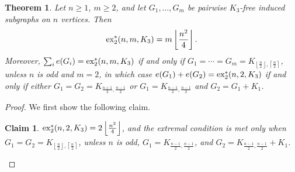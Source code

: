 \documentclass[12pt]{report}
\newtheorem{theorem}{Theorem}[chapter]
\newtheorem{claim}{Claim}[theorem]
\newcommand*{\dex}{\textnormal{ex}_2}
\begin{document}
\begin{theorem}\label{thm:induce-triangle}
  Let $n \geq 1$, $m \geq 2$, and let $G_1, \ldots, G_m$ be pairwise $K_3$-free induced subgraphs on $n$ vertices. Then
  \[
    \dex^*(n, m, K_3) = m \left\lfloor \frac{n^2}{4} \right\rfloor.
  \]
  Moreover, $\sum_i e(G_i) = \dex^*(n, m, K_3)$ if and only if $G_1 = \cdots = G_m = K_{\left\lfloor\frac{n}{2}\right\rfloor, \left\lceil\frac{n}{2}\right\rceil}$, unless $n$ is odd and $m = 2$, in which case $e(G_1) + e(G_2) = \dex^*(n, 2, K_3)$ if and only if either $G_1 = G_2 = K_{\frac{n + 1}{2}, \frac{n - 1}{2}}$ or $G_{1} = K_{\frac{n - 1}{2}, \frac{n - 1}{2}}$ and $G_{2} = G_1 + K_1$.
\end{theorem}

\begin{proof}
  We first show the following claim.

  \begin{claim}\label{claim:induce-triangle}
    $\dex^*(n, 2, K_3) = 2\left\lfloor\frac{n^2}{4}\right\rfloor$, and the extremal condition is met only when $G_1 = G_2 = K_{\left\lfloor\frac{n}{2}\right\rfloor, \left\lceil\frac{n}{2}\right\rceil}$, unless $n$ is odd, $G_1 = K_{\frac{n - 1}{2}, \frac{n - 1}{2}}$, and $G_2 = K_{\frac{n - 1}{2}, \frac{n - 1}{2}} + K_1$.
  \end{claim}


\end{proof}
\end{document}
